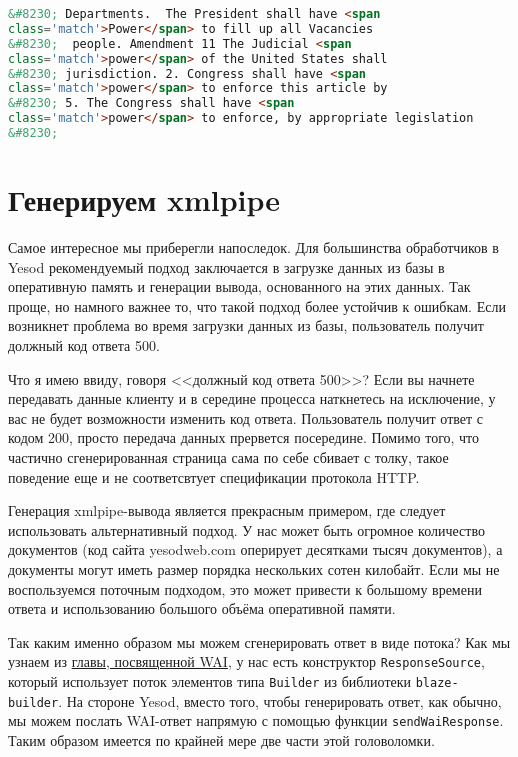 \begin{lstlisting}[language=HTML]
&#8230; Departments.  The President shall have <span
class='match'>Power</span> to fill up all Vacancies
&#8230;  people. Amendment 11 The Judicial <span
class='match'>power</span> of the United States shall
&#8230; jurisdiction. 2. Congress shall have <span
class='match'>power</span> to enforce this article by
&#8230; 5. The Congress shall have <span
class='match'>power</span> to enforce, by appropriate legislation
&#8230;
\end{lstlisting}

\section{Генерируем xmlpipe} %

Самое интересное мы приберегли напоследок. Для большинства обработчиков в Yesod рекомендуемый подход заключается в загрузке данных из базы в оперативную память и генерации вывода, основанного на этих данных. Так проще, но намного важнее то, что такой подход более устойчив к ошибкам.  Если возникнет проблема во время загрузки данных из базы, пользователь получит должный код ответа 500.

\begin{remark}
  Что я имею ввиду, говоря <<должный код ответа 500>>? Если вы начнете передавать данные клиенту и в середине процесса наткнетесь на исключение, у вас не будет возможности изменить код ответа. Пользователь получит ответ с кодом 200, просто передача данных прервется посередине. Помимо того, что частично сгенерированная страница сама по себе сбивает с толку, такое поведение еще и не соответсвтует спецификации протокола HTTP.
\end{remark}

Генерация xmlpipe-вывода является прекрасным примером, где следует использовать альтернативный подход. У нас может быть огромное количество документов (код сайта yesodweb.com оперирует десятками тысяч документов), а документы могут иметь размер порядка нескольких сотен килобайт. Если мы не воспользуемся поточным подходом, это может привести к большому времени ответа и использованию большого объёма оперативной памяти.

Так каким именно образом мы можем сгенерировать ответ в виде потока? %
Как мы узнаем из \hyperref[chap:web_application_interface]{главы, посвященной WAI}, у нас есть конструктор \lstinline!ResponseSource!, который использует поток элементов типа \lstinline!Builder! из библиотеки \lstinline'blaze-builder'. На стороне Yesod, вместо того, чтобы генерировать ответ, как обычно, мы можем послать WAI-ответ напрямую с помощью функции \lstinline'sendWaiResponse'. Таким образом имеется по крайней мере две части этой головоломки. %


